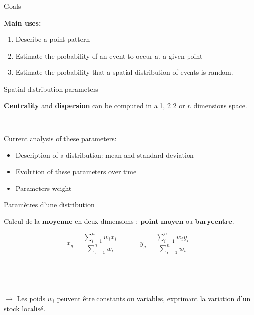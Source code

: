 \begin{frame}{Goals}

\textbf{Main uses:}

\begin{enumerate}
  \item Describe a point pattern 
  \item Estimate the probability of an event to occur at a given point
  \item Estimate the probability that a spatial distribution of events is random.
\end{enumerate}

\end{frame}


\begin{frame}{Spatial distribution parameters}

\textbf{Centrality} and \textbf{dispersion} can be computed in a 1, 2 2 or $n$ dimensions space. 

~

Current analysis of these parameters:

\begin{itemize}
\item Description of a distribution: mean and standard deviation
\item Evolution of these parameters over time
\item Parameters weight
\end{itemize}

\end{frame}


\begin{frame}{Paramètres d'une distribution}

Calcul de la \textbf{moyenne} en deux dimensions : \textbf{point moyen} ou \textbf{barycentre}.

$$
x_g = \frac{\sum_{i=1}^n w_i x_i}{\sum_{i=1}^n w_i} ~~~~~~~~~~~~~~~ y_g = \frac{\sum_{i=1}^n w_i y_i}{\sum_{i=1}^n w_i}
$$

~

~

$\rightarrow$ Les poids $w_i$ peuvent être constants ou variables, exprimant la variation d'un stock localisé.

\end{frame}



